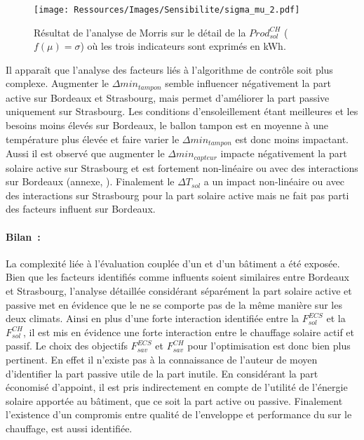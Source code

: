 \begin{figure}
    \centering
    \texttt{[image: Ressources/Images/Sensibilite/sigma\_mu\_2.pdf]}
    \caption[Résultat de l’analyse de Morris sur le détail de la
             $Prod_{sol}^{CH}$ ($f(\mu) = \sigma$)]
            {Résultat de l’analyse de Morris sur le détail de la
             $Prod_{sol}^{CH}$ ($f(\mu) = \sigma$) où les trois indicateurs sont exprimés
             en \si{kWh}.}
    \label{fig:prod_sol_chauffage_mu}
\end{figure}

Il apparaît que l’analyse des facteurs liés à l’algorithme de contrôle soit plus complexe.
Augmenter le $\Delta min_{tampon}$ semble influencer négativement la part active sur
Bordeaux et Strasbourg, mais permet d’améliorer la part passive uniquement sur
Strasbourg. Les conditions d’ensoleillement étant meilleures et les besoins moins
élevés sur Bordeaux, le ballon tampon est en moyenne à une température plus élevée et
faire varier le $\Delta min_{tampon}$ est donc moins impactant. Aussi il est observé que
augmenter le $\Delta min_{capteur}$ impacte négativement la part solaire active sur
Strasbourg et est fortement non-linéaire ou avec des interactions sur Bordeaux (annexe,
). Finalement le $\Delta T_{sol}$ a un impact
non-linéaire ou avec des interactions sur Strasbourg pour la part solaire active mais ne fait
pas parti des facteurs influent sur Bordeaux.

\paragraph{Bilan~:} %
\label{par:bilan_prod_sol_chauff}
La complexité liée à l’évaluation couplée d’un  et d’un bâtiment a été exposée.
Bien que les facteurs identifiés comme influents soient similaires entre Bordeaux et
Strasbourg, l’analyse détaillée considérant séparément la part solaire active et passive
met en évidence que le  ne se comporte pas de la même manière sur les deux
climats. Ainsi en plus d’une forte interaction identifiée entre la $F_{sol}^{ECS}$ et la
$F_{sol}^{CH}$, il est mis en évidence une forte interaction entre le chauffage solaire
actif et passif. Le choix des objectifs $F_{sav}^{ECS}$ et $F_{sav}^{CH}$ pour
l’optimisation est donc bien plus pertinent. En effet il n’existe pas à la connaissance de
l’auteur de moyen d’identifier la part passive utile de la part inutile. En considérant la
part économisé d’appoint, il est pris indirectement en compte de l’utilité de l’énergie
solaire apportée au bâtiment, que ce soit la part active ou passive. Finalement
l’existence d’un compromis entre qualité de l’enveloppe et performance du  sur le
chauffage, est aussi identifiée.



